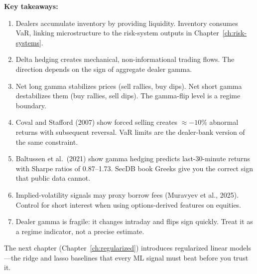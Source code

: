 \vspace{1em}

\noindent\textbf{Key takeaways:}
\begin{enumerate}[nosep]
  \item Dealers accumulate inventory by providing liquidity.
        Inventory consumes VaR, linking microstructure to the
        risk-system outputs in Chapter~\ref{ch:risk-systems}.
  \item Delta hedging creates mechanical, non-informational
        trading flows.  The direction depends on the sign of
        aggregate dealer gamma.
  \item Net long gamma stabilizes prices (sell rallies, buy dips).
        Net short gamma destabilizes them (buy rallies, sell dips).
        The gamma-flip level is a regime boundary.
  \item Coval and Stafford (2007) show forced selling creates
        $\approx -10\%$ abnormal returns with subsequent reversal.
        VaR limits are the dealer-bank version of the same constraint.
  \item Baltussen et al.\ (2021) show gamma hedging predicts
        last-30-minute returns with Sharpe ratios of 0.87--1.73.
        SecDB book Greeks give you the correct sign that public
        data cannot.
  \item Implied-volatility signals may proxy borrow fees
        (Muravyev et al., 2025).  Control for short interest when
        using options-derived features on equities.
  \item Dealer gamma is fragile: it changes intraday and flips
        sign quickly.  Treat it as a regime indicator, not a precise
        estimate.
\end{enumerate}

\noindent The next chapter (Chapter~\ref{ch:regularized}) introduces
regularized linear models---the ridge and lasso baselines that every
ML signal must beat before you trust it.
